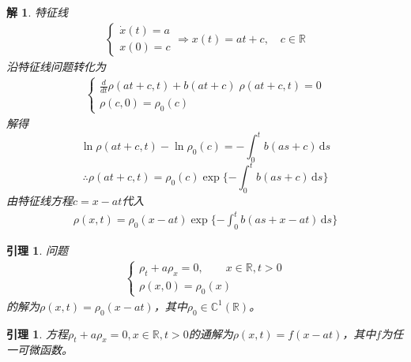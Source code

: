 \documentclass[11pt, a4paper]{article}
\theoremstyle{theorem}
\newtheorem{lemma}[thm]{引理}
\newtheorem*{slv}{解}
\newcommand{\intd}[1]{\,\mathrm{d}{#1}}
\begin{document}
\begin{slv}
特征线
\begin{align*}
\begin{cases}
\dot{x}(t) = a \\
x(0) = c
\end{cases}
\Longrightarrow x(t) = at +c, \quad c \in \mathbb{R}
\end{align*}
沿特征线问题转化为
\begin{align*}
\begin{cases}
\frac{d}{d t} \rho(at + c, t) + b(at + c) \; \rho(at + c, t) = 0 \\
\rho(c,0) = \rho_0(c)
\end{cases}
\end{align*}
解得
$$
\ln \rho(at + c, t) - \ln \rho_0(c) = - \int_0^t b(as + c) \intd s
$$
$$
\therefore \rho(at+c,t) = \rho_0(c) \exp\{- \int_0^t b(as + c) \intd s\}
$$
由特征线方程$c = x - at$代入
\begin{align}
    \rho(x,t) = \rho_0(x-at) \exp\{- \int_0^t b(as + x - at) \intd s\}
\end{align}
\end{slv}

\begin{lemma}
\label{lemma3-1}
问题
\begin{align}
    \begin{cases}
    \rho_t + a\rho_x = 0, \quad \quad x \in \mathbb{R}, t > 0 \\
    \rho(x,0) = \rho_0(x)
    \end{cases}
\end{align}
的解为$\rho(x,t) = \rho_0(x - at)$，其中$\rho_0 \in \mathbb{C}^1(\mathbb{R})$。
\end{lemma}

\begin{lemma}
方程$\rho_t + a \rho_x = 0,x \in \mathbb{R}, t > 0$的通解为$\rho(x,t) = f(x - at)$，其中$f$为任一可微函数。
\end{lemma}
\end{document}
